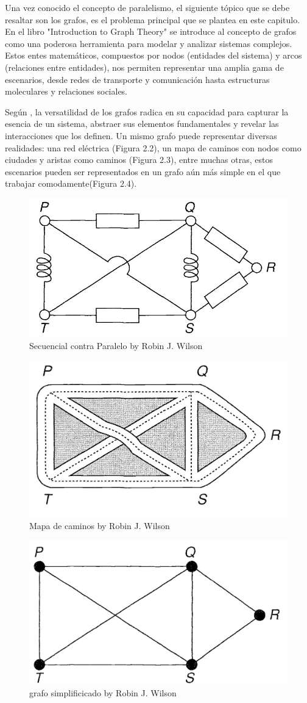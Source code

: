 Una vez conocido el concepto de paralelismo, el siguiente tópico que se debe resaltar son los grafos, es el problema principal que se plantea en este capitulo. En el libro "Introduction to Graph Theory" \cite{Wilson} se introduce al concepto de grafos como una poderosa herramienta para modelar y analizar sistemas complejos. Estos entes matemáticos, compuestos por nodos (entidades del sistema) y arcos (relaciones entre entidades), nos permiten representar una amplia gama de escenarios, desde redes de transporte y comunicación hasta estructuras moleculares y relaciones sociales.

Según \cite{Wilson}, la versatilidad de los grafos radica en su capacidad para capturar la esencia de un sistema, abstraer sus elementos fundamentales y revelar las interacciones que los definen. Un mismo grafo puede representar diversas realidades: una red eléctrica (Figura 2.2), un mapa de caminos con nodos como ciudades y aristas como caminos (Figura 2.3), entre muchas otras, estos escenarios pueden ser representados en un grafo aún más simple en el que trabajar comodamente(Figura 2.4).

\begin{figure}[h]
	\centering \includegraphics[width=0.45\linewidth]{img/red_electrica_expresada_como_grafo2.jpg}
	\caption{Secuencial contra Paralelo by Robin J. Wilson }
	\label{fig:etiqueta1}
\end{figure}

\begin{figure}[h]
	\centering \includegraphics[width=0.45\linewidth]{img/caminos_expresado_como_grafo3.jpg}
	\caption{Mapa de caminos by Robin J. Wilson}
	\label{fig:etiqueta1}
\end{figure}

\begin{figure}[h]
	\centering \includegraphics[width=0.45\linewidth]{img/grafo_simplificado4.jpg}
	\caption{grafo simplificicado by Robin J. Wilson}
	\label{fig:etiqueta1}
\end{figure}

